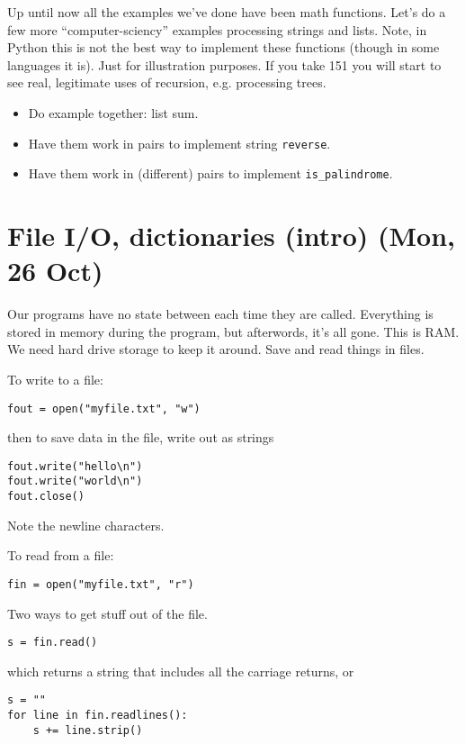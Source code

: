 \documentclass{article}
\begin{document}
Up until now all the examples we've done have been math functions.
Let's do a few more ``computer-sciency'' examples processing strings
and lists.  Note, in Python this is not the best way to implement
these functions (though in some languages it is).  Just for
illustration purposes.  If you take 151 you will start to see real,
legitimate uses of recursion, e.g. processing trees.

\begin{itemize}
\item Do example together: list sum.
\item Have them work in pairs to implement string \verb|reverse|.
\item Have them work in (different) pairs to implement \verb|is_palindrome|.
\end{itemize}

\section*{File I/O, dictionaries (intro) (Mon, 26 Oct)}

Our programs have no state between each time they are called.
Everything is stored in memory during the program, but afterwords,
it's all gone.  This is RAM.  We need hard drive storage to keep it
around.  Save and read things in files.

To write to a file:

\begin{verbatim}
fout = open("myfile.txt", "w")
\end{verbatim}

then to save data in the file, write out as strings

\begin{verbatim}
fout.write("hello\n")
fout.write("world\n")
fout.close()
\end{verbatim}
Note the newline characters.

To read from a file:

\begin{verbatim}
fin = open("myfile.txt", "r")
\end{verbatim}

Two ways to get stuff out of the file.

\begin{verbatim}
s = fin.read()
\end{verbatim}

which returns a string that includes all the carriage returns, or

\begin{verbatim}
s = ""
for line in fin.readlines():
    s += line.strip()
\end{verbatim}
\end{document}
